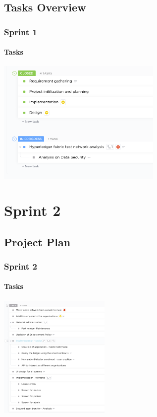 \documentclass[english,hangout]{beamer}
\begin{document}
\subsection{Tasks Overview}

\begin{frame}[fragile]
 \frametitle{Sprint 1}
 \framesubtitle{Tasks}
    \begin{center}
        \vspace{-1.2em}
            \includegraphics[height=6cm]{Sprint1Results.png}
        \end{center}
\end{frame}


\section{Sprint 2}

\subsection{Project Plan}

\begin{frame}[fragile]
 \frametitle{Sprint 2}
 \framesubtitle{Tasks}
    \begin{center}
        \vspace{-1.2em}
            \includegraphics[height=6cm]{Sprint2Tasks.png}
        \end{center}
        \vspace{-3mm}
\end{frame}
\end{document}
